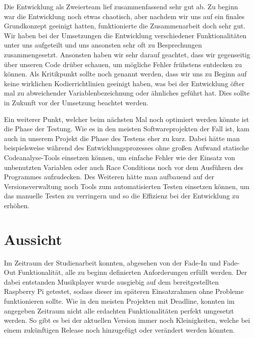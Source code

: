 Die Entwicklung als Zweierteam lief zusammenfassend sehr gut ab.
Zu beginn war die Entwicklung noch etwas chaotisch, aber
nachdem wir uns auf ein finales Grundkonzept geeinigt hatten, funktionierte die
Zusammenarbeit doch sehr gut. Wir haben bei der Umsetzungen die Entwicklung
verschiedener Funktionalitäten unter uns aufgeteilt und uns ansonsten sehr oft
zu Besprechungen zusammengesetzt. Ansonsten haben wir sehr darauf geachtet, dass
wir gegenseitig über unseren Code drüber schauen, um mögliche Fehler frühstens
entdecken zu können. Als Kritikpunkt sollte noch genannt werden, dass wir uns
zu Beginn auf keine wirklichen Kodierrichtlinien geeinigt haben, was bei der
Entwicklung öfter mal zu abweichender Variablenbezeichnung oder ähnliches
geführt hat. Dies sollte in Zukunft vor der Umsetzung beachtet werden. \newline

Ein weiterer Punkt, welcher beim nächsten Mal noch optimiert werden könnte ist
die Phase der Testung. Wie es in den meisten Softwareprojekten der Fall ist, %
kam auch in unserem Projekt die Phase des Testens eher zu kurz. Dabei hätte man
beispielsweise während des Entwicklungsprozesses ohne großen Aufwand statische
Codeanalyse-Tools einsetzen können, um einfache Fehler wie der Einsatz von
unbenutzten Variablen oder auch Race Conditions noch vor dem Ausführen des
Programmes aufzudecken. Des Weiteren hätte man aufbauend auf der
Versionsverwaltung noch Tools zum automatisierten Testen einsetzen können, um
das manuelle Testen zu verringern und so die Effizienz bei der Entwicklung zu
erhöhen.

\begin{comment}
- Codierrichtlinien
- Viel gelernt
- Go als Programmiersprache
- Kommunikation über Sockets zwischen zwei Programmen
- Analyse zu kurz
- Testung zu kurz
  - Countinous Integration
  - Static Code analysis
  - automatic testing with unit test
\end{comment}



\section{Aussicht}
Im Zeitraum der Studienarbeit konnten, abgesehen von der Fade-In und Fade-Out
Funktionalität, alle zu beginn definierten Anforderungen erfüllt werden. Der
dabei entstanden Musikplayer wurde ausgiebig auf dem bereitgestellten Raspberry Pi
getestet, sodass dieser im späteren Einsatzrahmen ohne Probleme funktionieren
sollte. \newline
Wie in den meisten Projekten mit Deadline, konnten im angegeben Zeitraum nicht
alle erdachten Funktionalitäten  perfekt umgesetzt werden. So gibt es bei der
aktuellen Version immer noch Kleinigkeiten, welche bei einem zukünftigen Release
noch hinzugefügt oder verändert werden könnten. \hfill \break

